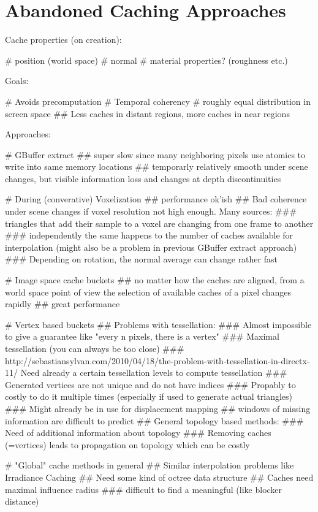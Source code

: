 \documentclass[thesis.tex]{subfiles}
\begin{document}
\appendix


\chapter{Abandoned Caching Approaches} \label{chap:abandoned}

Cache properties (on creation):
\begin{easylist}[itemize]
# position (world space)
# normal
# material properties? (roughness etc.)
\end{easylist}

Goals:
\begin{easylist}[itemize]
# Avoids precomputation
# Temporal coherency
# roughly equal distribution in screen space
## Less caches in distant regions, more caches in near regions
\end{easylist}
Approaches:
\begin{easylist}[itemize]
# GBuffer extract
## super slow since many neighboring pixels use atomics to write into same memory locations
## temporarly relatively smooth under scene changes, but visible information loss and changes at depth discontinuities

# During (converative) Voxelization
## performance ok'ish
## Bad coherence under scene changes if voxel resolution not high enough. Many sources:
### triangles that add their sample to a voxel are changing from one frame to another
### independently the same happens to the number of caches available for interpolation (might also be a problem in previous GBuffer extract approach)
### Depending on rotation, the normal average can change rather fast

# Image space cache buckets
## no matter how the caches are aligned, from a world space point of view the selection of available caches of a pixel changes rapidly
## great performance

# Vertex based buckets
## Problems with tessellation:
### Almost impossible to give a guarantee like "every n pixels, there is a vertex"
### Maximal tessellation (you can always be too close)
### http://sebastiansylvan.com/2010/04/18/the-problem-with-tessellation-in-directx-11/
Need already a certain tessellation levels to compute tessellation
### Generated vertices are not unique and do not have indices
### Propably to costly to do it multiple times (especially if used to generate actual triangles)
### Might already be in use for displacement mapping
## windows of missing information are difficult to predict
## General topology based methods:
### Need of additional information about topology
### Removing caches (=vertices) leads to propagation on topology which can be costly

# "Global" cache methods in general
## Similar interpolation problems like Irradiance Caching
## Need some kind of octree data structure
## Caches need maximal influence radius
### difficult to find a meaningful (like blocker distance)
\end{easylist}
\end{document}
